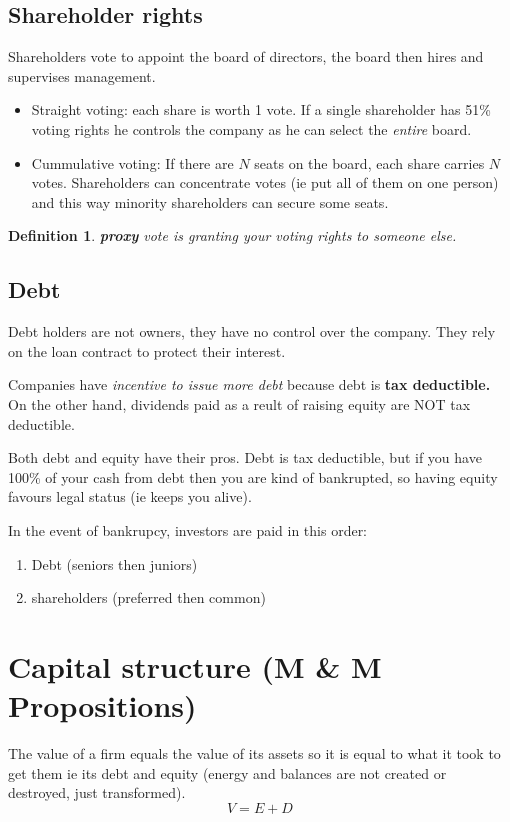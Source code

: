 \documentclass{article}
\newtheorem{definition}{Definition}
\begin{document}
\subsection{Shareholder rights}
Shareholders vote to appoint the board of directors, the board then hires and supervises management.  
\begin{itemize}
\item Straight voting: each share is worth 1 vote. If a single shareholder has 51\% voting rights he controls the company as he can select the \textit{entire} board. 
\item  Cummulative voting: If there are $N$ seats on the board, each share carries $N$ votes. Shareholders can concentrate votes (ie put all of them on one person) and this way minority shareholders can secure some seats. 
\end{itemize}
\begin{definition}
\textbf{proxy} vote is granting your voting rights to someone else.
\end{definition}

\subsection{Debt}
Debt holders are not owners, they have no control over the company. They rely on the loan contract to protect their interest. 

Companies have \textit{incentive to issue more debt} because debt is \textbf{tax deductible.} On the other hand, dividends paid as a reult of raising equity are NOT tax deductible.

Both debt and equity have their pros. Debt is tax deductible, but if you have 100\% of your cash from debt then you are kind of bankrupted, so having equity favours legal status (ie keeps you alive).

In the event of bankrupcy, investors are paid in this order:
\begin{enumerate}
\item Debt (seniors then juniors)
\item shareholders (preferred then common)
\end{enumerate}


\section{Capital structure (M \& M Propositions)}
The value of a firm equals the value of its assets so it is equal to what it took to get them  ie its debt and equity (energy and balances are not created or destroyed, just transformed). 
\[ V = E + D \]
\end{document}
